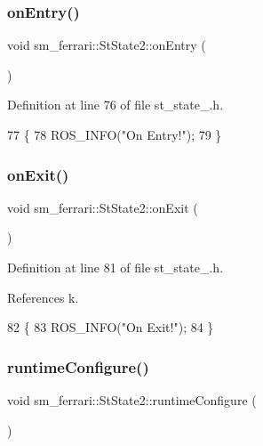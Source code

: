 \subsubsection{\texorpdfstring{on\+Entry()}{onEntry()}}
{\footnotesize\ttfamily void sm\+\_\+ferrari\+::\+St\+State2\+::on\+Entry (\begin{DoxyParamCaption}{ }\end{DoxyParamCaption})\hspace{0.3cm}{\ttfamily [inline]}}



Definition at line 76 of file st\+\_\+state\+\_.\+h.


\begin{DoxyCode}
77         \{
78             ROS\_INFO(\textcolor{stringliteral}{"On Entry!"});
79         \}
\end{DoxyCode}
\mbox{\label{structsm__ferrari_1_1StState2_a4b8c24281cf71ebfc54d280886de30ca}} 
\subsubsection{\texorpdfstring{on\+Exit()}{onExit()}}
{\footnotesize\ttfamily void sm\+\_\+ferrari\+::\+St\+State2\+::on\+Exit (\begin{DoxyParamCaption}{ }\end{DoxyParamCaption})\hspace{0.3cm}{\ttfamily [inline]}}



Definition at line 81 of file st\+\_\+state\+\_.\+h.



References k.


\begin{DoxyCode}
82         \{
83             ROS\_INFO(\textcolor{stringliteral}{"On Exit!"});
84         \}
\end{DoxyCode}
\mbox{\label{structsm__ferrari_1_1StState2_a9bcdeff671e5e19eb07a32bedca1f161}} 
\subsubsection{\texorpdfstring{runtime\+Configure()}{runtimeConfigure()}}
{\footnotesize\ttfamily void sm\+\_\+ferrari\+::\+St\+State2\+::runtime\+Configure (\begin{DoxyParamCaption}{ }\end{DoxyParamCaption})\hspace{0.3cm}{\ttfamily [inline]}}



